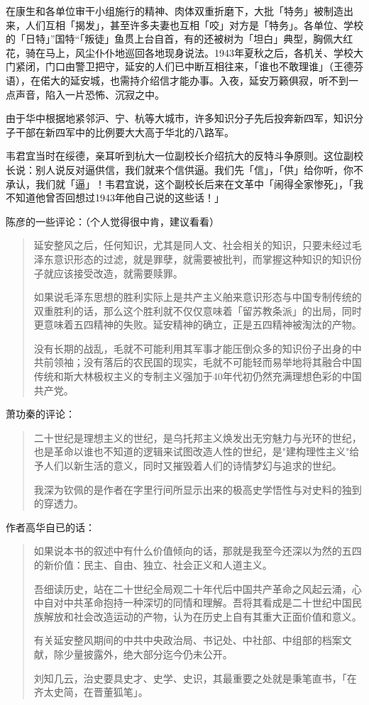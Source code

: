 在康生和各单位审干小组施行的精神、肉体双重折磨下，大批「特务」被制造出来，人们互相「揭发」，甚至许多夫妻也互相「咬」对方是「特务」。各单位、学校的「日特」”国特“「叛徒」鱼贯上台自首，有的还被树为「坦白」典型，胸佩大红花，骑在马上，风尘仆仆地巡回各地现身说法。1943年夏秋之后，各机关、学校大门紧闭，门口由警卫把守，延安的人们已中断互相往来，「谁也不敢理谁」（王德芬语），在偌大的延安城，也需持介绍信才能办事。入夜，延安万籁俱寂，听不到一点声音，陷入一片恐怖、沉寂之中。

由于华中根据地紧邻沪、宁、杭等大城市，许多知识分子先后投奔新四军，知识分子干部在新四军中的比例要大大高于华北的八路军。

韦君宜当时在绥德，亲耳听到杭大一位副校长介绍抗大的反特斗争原则。这位副校长说：别人说反对逼供信，我们就来个信供逼。我们先「信」，「供」给你听，你不承认，我们就「逼」！韦君宜说，这个副校长后来在文革中「闹得全家惨死」，「我不知道他曾否回想过1943年他自己说的这些话！」

陈彦的一些评论：（个人觉得很中肯，建议看看）
\begin{quotation}
延安整风之后，任何知识，尤其是同人文、社会相关的知识，只要未经过毛泽东意识形态的过滤，就是罪孽，就需要被批判，而掌握这种知识的知识份子就应该接受改造，就需要赎罪。

如果说毛泽东思想的胜利实际上是共产主义舶来意识形态与中国专制传统的双重胜利的话，那么这个胜利就不仅仅意味着「留苏教条派」的出局，同时更意味着五四精神的失败。延安精神的确立，正是五四精神被淘汰的产物。

没有长期的战乱，毛就不可能利用其军事才能压倒众多的知识份子出身的中共前领袖；没有落后的农民国的现实，毛就不可能轻而易举地将其融合中国传统和斯大林极权主义的专制主义强加于40年代初仍然充满理想色彩的中国共产党。
\end{quotation}

萧功秦的评论：
\begin{quotation}
二十世纪是理想主义的世纪，是乌托邦主义焕发出无穷魅力与光环的世纪，也是革命以谁也不知道的逻辑来试图改造人性的世纪，是"建构理性主义"给予人们以新生活的意义，同时又摧毁着人们的诗情梦幻与追求的世纪。

我深为钦佩的是作者在字里行间所显示出来的极高史学悟性与对史料的独到的穿透力。
\end{quotation}

作者高华自已的话：
\begin{quotation}
如果说本书的叙述中有什么价值倾向的话，那就是我至今还深以为然的五四的新价值：民主、自由、独立、社会正义和人道主义。

吾细读历史，站在二十世纪全局观二十年代后中国共产革命之风起云涌，心中自对中共革命抱持一种深切的同情和理解。吾将其看成是二十世纪中国民族解放和社会改造运动的产物，认为在历史上自有其重大正面价值和意义。

有关延安整风期间的中共中央政治局、书记处、中社部、中组部的档案文献，除少量披露外，绝大部分迄今仍未公开。

刘知几云，治史要具史才、史学、史识，其最重要之处就是秉笔直书，「在齐太史简，在晋董狐笔」。
\end{quotation}

